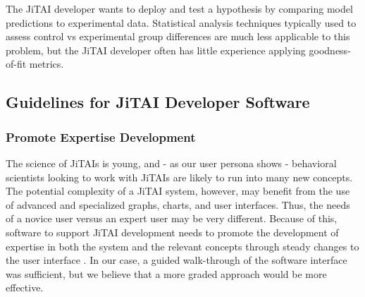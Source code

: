 \documentclass{sigchi}
\begin{document}
The JiTAI developer wants to deploy and test a hypothesis by comparing model predictions to experimental data.
Statistical analysis techniques typically used to assess control vs experimental group differences are much less applicable to this problem, but the JiTAI developer often has little experience applying goodness-of-fit metrics.


\subsection{Guidelines for JiTAI Developer Software}

\subsubsection{Promote Expertise Development}
The science of JiTAIs is young, and - as our user persona shows - behavioral scientists looking to work with JiTAIs are likely to run into many new concepts.
The potential complexity of a JiTAI system, however, may benefit from the use of advanced and specialized graphs, charts, and user interfaces. 
Thus, the needs of a novice user versus an expert user may be very different.
Because of this, software to support JiTAI development needs to promote the development of expertise in both the system and the relevant concepts through steady changes to the user interface \cite{cockburn2014supporting}.
In our case, a guided walk-through of the software interface was sufficient, but we believe that a more graded approach would be more effective. 
\end{document}
